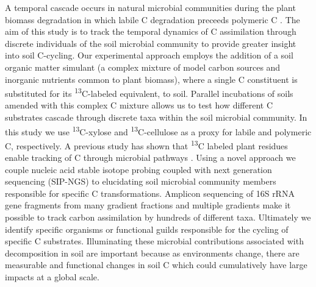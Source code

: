 A temporal cascade occurs in natural microbial communities during the plant biomass degradation in which labile C degradation preceeds polymeric C \cite{Hu_1997,Rui_2009}. The aim of this study is to track the temporal dynamics of C assimilation through discrete individuals of the soil microbial community to provide greater insight into soil C-cycling. Our experimental approach employs the addition of a soil organic matter simulant (a complex mixture of model carbon sources and inorganic nutrients common to plant biomass), where a single C constituent is substituted for its \textsuperscript{13}C-labeled equivalent, to soil. Parallel incubations of soils amended with this complex C mixture allows us to test how different C substrates cascade through discrete taxa within the soil microbial community. In this study we use \textsuperscript{13}C-xylose and \textsuperscript{13}C-cellulose as a proxy for labile and polymeric C, respectively. A previous study has shown that \textsuperscript{13}C labeled plant residues enable tracking of C through microbial pathways \cite{Evershed_2006}. Using a novel approach we couple nucleic acid stable isotope probing coupled with next generation sequencing (SIP-NGS) to elucidating soil microbial community members responsible for specific C transformations. Amplicon sequencing of 16S rRNA gene fragments from many gradient fractions and multiple gradients make it possible to track carbon assimilation by hundreds of different taxa. Ultimately we identify specific organisms or functional guilds responsible for the cycling of specific C substrates. Illuminating these microbial contributions associated with decomposition in soil are important because as environments change, there are measurable and functional changes in soil C \cite{Grandy_2008} which could cumulatively have large impacts at a global scale.

